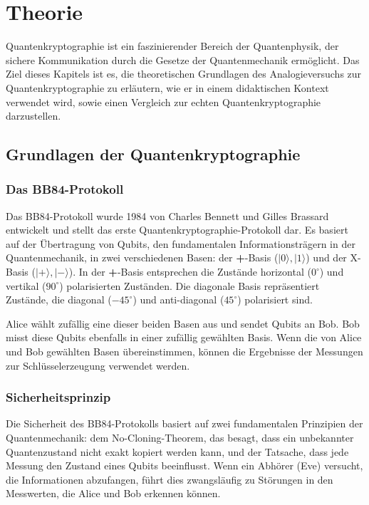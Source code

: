\section{Theorie}
Quantenkryptographie ist ein faszinierender Bereich der Quantenphysik, der sichere Kommunikation durch die Gesetze der Quantenmechanik ermöglicht. Das Ziel dieses Kapitels ist es, die theoretischen Grundlagen des Analogieversuchs zur Quantenkryptographie zu erläutern, wie er in einem didaktischen Kontext verwendet wird, sowie einen Vergleich zur echten Quantenkryptographie darzustellen.

\subsection{Grundlagen der Quantenkryptographie}
\subsubsection{Das BB84-Protokoll}
Das BB84-Protokoll wurde 1984 von Charles Bennett und Gilles Brassard entwickelt und stellt das erste Quantenkryptographie-Protokoll dar. Es basiert auf der Übertragung von Qubits, den fundamentalen Informationsträgern in der Quantenmechanik, in zwei verschiedenen Basen: der \textbf{+}-Basis (\( |0\rangle, |1\rangle \)) und der X-Basis (\( |+\rangle, |-\rangle \)). In der \textbf{+}-Basis entsprechen die Zustände horizontal (\(0^\circ\)) und vertikal (\(90^\circ\)) polarisierten Zuständen. Die diagonale Basis repräsentiert Zustände, die diagonal (\(-45^\circ\)) und anti-diagonal (\(45^\circ\)) polarisiert sind.

Alice wählt zufällig eine dieser beiden Basen aus und sendet Qubits an Bob. Bob misst diese Qubits ebenfalls in einer zufällig gewählten Basis. Wenn die von Alice und Bob gewählten Basen übereinstimmen, können die Ergebnisse der Messungen zur Schlüsselerzeugung verwendet werden.

\subsubsection{Sicherheitsprinzip}
Die Sicherheit des BB84-Protokolls basiert auf zwei fundamentalen Prinzipien der Quantenmechanik: dem No-Cloning-Theorem, das besagt, dass ein unbekannter Quantenzustand nicht exakt kopiert werden kann, und der Tatsache, dass jede Messung den Zustand eines Qubits beeinflusst. Wenn ein Abhörer (Eve) versucht, die Informationen abzufangen, führt dies zwangsläufig zu Störungen in den Messwerten, die Alice und Bob erkennen können.

